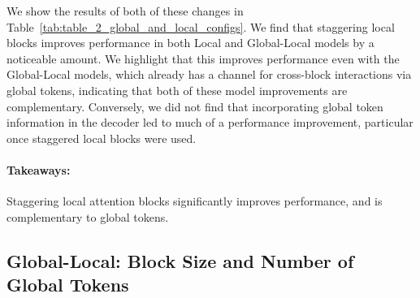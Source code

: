 \documentclass[11pt]{article}
\begin{document}
We show the results of both of these changes in Table~\ref{tab:table_2_global_and_local_configs}.
We find that staggering local blocks improves performance in both Local and Global-Local models by a noticeable amount.
We highlight that this improves performance even with the Global-Local models, which already has a channel for cross-block interactions via global tokens, indicating that both of these model improvements are complementary.
Conversely, we did not find that incorporating global token information in the decoder led to much of a performance improvement, particular once staggered local blocks were used.

\paragraph{Takeaways:} Staggering local attention blocks significantly improves performance, and is complementary to global tokens.



\subsection{Global-Local: Block Size and Number of Global Tokens}
\end{document}
